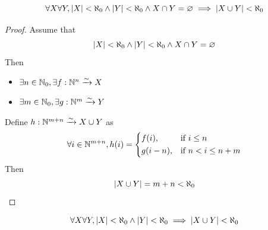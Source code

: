 \bigskip

\begin{lemma} \label{an:lem:union-of-two-disjoint-finite-sets-is-finite}
    \[
    \forall X \forall Y, \abs*{X} < \aleph_{0} \land \abs*{Y} < \aleph_{0}
    \land X \cap Y = \vnot \implies \abs*{X \cup Y} < \aleph_{0}
    \]
\end{lemma}

\begin{proof}
    Assume that
    \[
    \abs*{X} < \aleph_{0} \land \abs*{Y} < \aleph_{0} \land X \cap Y = \vnot
    \]
    Then
    \begin{itemize}
        \item $\exists n \in \N_{0}, \exists f: \N^{n} \xrightarrow{\sim} X$
        \item $\exists m \in \N_{0}, \exists g: \N^{m} \xrightarrow{\sim} Y$
    \end{itemize}
    Define $h: \N^{m + n} \xrightarrow{\sim} X \cup Y$ as
    \[
    \forall i \in \N^{m + n}, h(i) = \begin{dcases}
        f(i), & \text{if } i \leq n \\
        g(i - n), & \text{if } n < i \leq n + m
    \end{dcases}
    \]
    Then
    \[
    \abs*{X \cup Y} = m + n < \aleph_{0}
    \]
\end{proof}

\bigskip

\begin{theorem} \label{an:thm:union-of-two-finite-sets-is-finite}
    \[
    \forall X \forall Y, \abs*{X} < \aleph_{0} \land \abs*{Y} < \aleph_{0} \implies \abs*{X \cup Y} < \aleph_{0}
    \]
\end{theorem}

